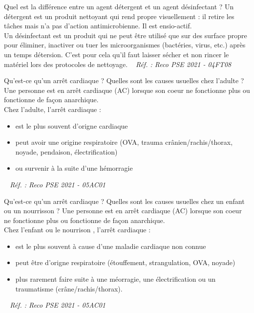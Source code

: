 \documentclass[grid,avery5371,landscape]{flashcards}
\makeatletter
\newcounter{nocarte}
\newcommand{\categ}[1]{%
  \def\@categ{#1}%
  \setcounter{nocarte}{0}%
}
\newcommand{\source}[1]{%
  \medskip
  \itshape%
   ~ \hfill Réf. : #1}
\makeatother
\begin{document}
\color[HTML]{003273}
\categ{PSE}
\begin{flashcard}[matériel]{
 Quel est la différence entre un agent détergent et un agent désinfectant ?   }
  Un détergent est un produit nettoyant qui rend propre visuellement : il retire les tâches mais n'a pas d'action antimicrobienne. Il est ensio-actif. \\ Un désinfectant est un produit qui ne peut être utilisé que sur des surface propre pour éliminer, inactiver ou tuer les microorganismes (bactéries, virus, etc.) après un temps détersion. C'est pour cela qu'il faut laisser sécher et non rincer le matériel lors des protocoles de nettoyage.
  \source{Reco PSE 2021 - 04FT08}
\end{flashcard}


\color[HTML]{003273}
\categ{PSE}
\begin{flashcard}[bilan]{
 Qu'est-ce qu'un arrêt cardiaque ? Quelles sont les causes usuelles chez l'adulte ?   }
  Une personne est en arrêt cardiaque (AC) lorsque son coeur ne fonctionne plus ou fonctionne de façon anarchique. \\
Chez l'adulte, l'arrêt cardiaque : \begin{itemize} \item est le plus souvent d'origne cardiaque \item peut avoir une origine respiratoire (OVA, trauma crânien/rachis/thorax, noyade, pendaison, électrification) \item ou survenir à la suite d'une hémorragie \end{itemize}
  \source{Reco PSE 2021 - 05AC01}
\end{flashcard}


\color[HTML]{003273}
\categ{PSE}
\begin{flashcard}[bilan]{
 Qu'est-ce qu'un arrêt cardiaque ? Quelles sont les causes usuelles chez un enfant ou un nourrisson ?   }
  Une personne est en arrêt cardiaque (AC) lorsque son coeur ne fonctionne plus ou fonctionne de façon anarchique. \\
Chez l'enfant ou le nourrison , l'arrêt cardiaque : \begin{itemize} \item est le plus souvent à cause d'une maladie cardiaque non connue \item peut être d'origne respiratoire (étouffement, strangulation, OVA, noyade) \item plus rarement faire suite à une méorragie, une électrification ou un traumatisme (crâne/rachis/thorax). \end{itemize}
  \source{Reco PSE 2021 - 05AC01}
\end{flashcard}
\end{document}
